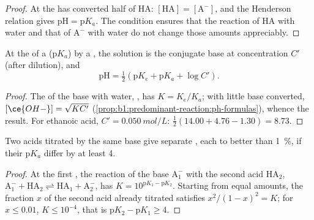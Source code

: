 \begin{proof}
At  the  
has converted half of HA: $[\mathrm{HA}] = [\mathrm{A^-}]$, and the
Henderson relation gives $\mathrm{pH} = \mathrm{p}K_a$. The condition
ensures that the reaction of HA with water and that of $\mathrm{A^-}$
with water do not change those amounts appreciably.
\end{proof}

\begin{proposition}\label{prop:b1:titration-methods:ph-at-equivalence}
At the  of a  ($\mathrm{p}K_a$) by a , the
solution is the conjugate base at concentration $C'$ (after dilution), and
\[
  \mathrm{pH} = \tfrac12(\mathrm{p}K_e + \mathrm{p}K_a + \log C') .
\]
\end{proposition}

\begin{proof}
The  of the base with water,
, has $K = K_e/K_a$; with little base
converted, $[\ce{OH-}] = \sqrt{KC'}$ (\cref{prop:b1:predominant-reaction:ph-formulas}),
whence the result. For ethanoic acid, $C' = \qty{0.050}{mol/L}$:
$\frac12(14.00 + 4.76 - 1.30) = 8.73$.
\end{proof}

\begin{proposition}\label{prop:b1:titration-methods:successive}
Two acids titrated by the same base give separate , each to
better than \qty{1}{\percent}, if their $\mathrm{p}K_a$ differ by at least 4.
\end{proposition}

\begin{proof}
At the first , the reaction of the base $\mathrm{A_1^-}$ with
the second acid $\mathrm{HA_2}$, $\mathrm{A_1^-} + \mathrm{HA_2}
\rightleftharpoons \mathrm{HA_1} + \mathrm{A_2^-}$, has $K = 10^{\mathrm{p}K_1 - \mathrm{p}K_2}$.
Starting from equal amounts, the fraction $x$ of the second acid already
titrated satisfies $x^2/(1 - x)^2 = K$; for $x \leqslant 0.01$, $K
\leqslant 10^{-4}$, that is $\mathrm{p}K_2 - \mathrm{p}K_1 \geqslant 4$.
\end{proof}

